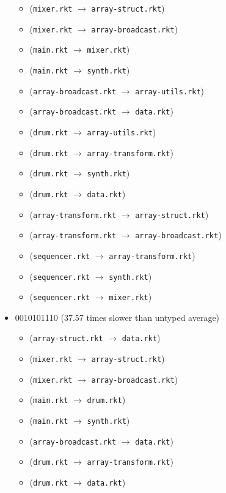 \documentclass{article}
\newcommand{\mono}[1]{\texttt{#1}}
\begin{document}
\begin{itemize}
\begin{itemize}
  \item (\mono{mixer.rkt} $\rightarrow$ \mono{array-struct.rkt})
  \item (\mono{mixer.rkt} $\rightarrow$ \mono{array-broadcast.rkt})
  \item (\mono{main.rkt} $\rightarrow$ \mono{mixer.rkt})
  \item (\mono{main.rkt} $\rightarrow$ \mono{synth.rkt})
  \item (\mono{array-broadcast.rkt} $\rightarrow$ \mono{array-utils.rkt})
  \item (\mono{array-broadcast.rkt} $\rightarrow$ \mono{data.rkt})
  \item (\mono{drum.rkt} $\rightarrow$ \mono{array-utils.rkt})
  \item (\mono{drum.rkt} $\rightarrow$ \mono{array-transform.rkt})
  \item (\mono{drum.rkt} $\rightarrow$ \mono{synth.rkt})
  \item (\mono{drum.rkt} $\rightarrow$ \mono{data.rkt})
  \item (\mono{array-transform.rkt} $\rightarrow$ \mono{array-struct.rkt})
  \item (\mono{array-transform.rkt} $\rightarrow$ \mono{array-broadcast.rkt})
  \item (\mono{sequencer.rkt} $\rightarrow$ \mono{array-transform.rkt})
  \item (\mono{sequencer.rkt} $\rightarrow$ \mono{synth.rkt})
  \item (\mono{sequencer.rkt} $\rightarrow$ \mono{mixer.rkt})
  \end{itemize}
\item 0010101110 (37.57 times slower than untyped average)
  \begin{itemize}
  \item (\mono{array-struct.rkt} $\rightarrow$ \mono{data.rkt})
  \item (\mono{mixer.rkt} $\rightarrow$ \mono{array-struct.rkt})
  \item (\mono{mixer.rkt} $\rightarrow$ \mono{array-broadcast.rkt})
  \item (\mono{main.rkt} $\rightarrow$ \mono{drum.rkt})
  \item (\mono{main.rkt} $\rightarrow$ \mono{synth.rkt})
  \item (\mono{array-broadcast.rkt} $\rightarrow$ \mono{data.rkt})
  \item (\mono{drum.rkt} $\rightarrow$ \mono{array-transform.rkt})
  \item (\mono{drum.rkt} $\rightarrow$ \mono{data.rkt})

\end{itemize}
\end{itemize}
\end{document}
